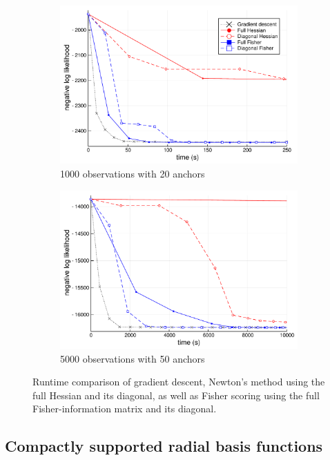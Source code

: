 \documentclass{article}
\numberwithin{equation}{section}
\begin{document}
\begin{figure}[t!]
  \begin{subfigure}[t]{0.5\textwidth}
    \includegraphics[width=\textwidth]{figures/timing/p1000-a20-plot.pdf}
    \caption{1000 observations with 20 anchors}
  \end{subfigure}%
  \begin{subfigure}[t]{0.5\textwidth}
    \includegraphics[width=\textwidth]{figures/timing/p5000-a50-plot.pdf}
    \caption{5000 observations with 50 anchors}
  \end{subfigure}
  \caption{Runtime comparison of gradient descent, Newton's method using the full Hessian and its diagonal, as well as Fisher scoring using the full Fisher-information matrix and its diagonal.}
  \label{fig:timing}
\end{figure}

\subsection{Compactly supported radial basis functions}
\end{document}

